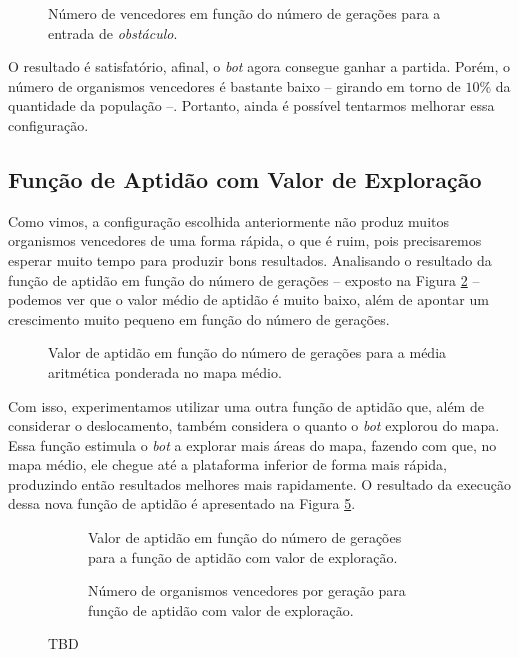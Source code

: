 \begin{figure}[H]
\caption{Número de vencedores em função do número de gerações para a
entrada de \textit{obstáculo}.}
\label{fig:obstacle-input-wam-winners}
\end{figure}

O resultado é satisfatório, afinal, o \textit{bot} agora consegue ganhar a
partida. Porém, o número de organismos vencedores é bastante baixo -- girando
em torno de $10\%$ da quantidade da população --. Portanto, ainda é possível
tentarmos melhorar essa configuração.

\subsection{Função de Aptidão com Valor de Exploração}

Como vimos, a configuração escolhida anteriormente não produz muitos organismos
vencedores de uma forma rápida, o que é ruim, pois precisaremos esperar muito
tempo para produzir bons resultados. Analisando o resultado da função de
aptidão em função do número de gerações -- exposto na Figura
\ref{fig:obstacle-input-wam-fitness} -- podemos ver que o valor médio de
aptidão é muito baixo, além de apontar um crescimento muito pequeno em função
do número de gerações.

\begin{figure}[H]
\caption{Valor de aptidão em função do número de gerações para a média
aritmética ponderada no mapa médio.}
\label{fig:obstacle-input-wam-fitness}
\end{figure}

Com isso, experimentamos utilizar uma outra função de aptidão que, além de
considerar o deslocamento, também considera o quanto o \textit{bot} explorou do
mapa. Essa função estimula o \textit{bot} a explorar mais áreas do mapa,
fazendo com que, no mapa médio, ele chegue até a plataforma inferior de forma
mais rápida, produzindo então resultados melhores mais rapidamente. O resultado
da execução dessa nova função de aptidão é apresentado na Figura
\ref{fig:obstacle-input-ex-fitness}.

\begin{figure}[H]
\centering
	\begin{subfigure}[b]{0.4\textwidth}
        \caption{Valor de aptidão em função do número de gerações para a função
        de aptidão com valor de exploração.}
		\label{fig:tbd1}
	\end{subfigure}
	\begin{subfigure}[b]{0.4\textwidth}
        \caption{Número de organismos vencedores por geração para função de
        aptidão com valor de exploração.}
		\label{fig:tbd1}
	\end{subfigure}

    \caption{TBD}
    \label{fig:obstacle-input-ex-fitness}
\end{figure}


